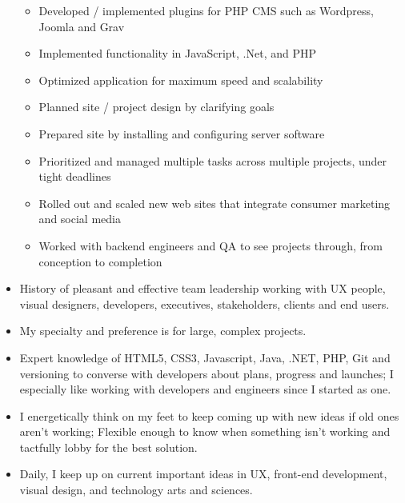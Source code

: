 \documentclass{resume}
\begin{document}
\begin{itemize}
\begin{itemize}
      \item Developed / implemented plugins for PHP CMS such as Wordpress, Joomla and Grav
      \item Implemented functionality in JavaScript, .Net, and PHP
      \item Optimized application for maximum speed and scalability
      \item Planned site / project design by clarifying goals
      \item Prepared site by installing and configuring server software
      \item Prioritized and managed multiple tasks across multiple projects, under tight deadlines
      \item Rolled out and scaled new web sites that integrate consumer marketing and social media
      \item Worked with backend engineers and QA to see projects through, from conception to completion
    \end{itemize}
    \item History of pleasant and effective team leadership working with UX people, visual designers, developers, executives, stakeholders, clients and end users.
    \item My specialty and preference is for large, complex projects.
    \item Expert knowledge of HTML5, CSS3, Javascript, Java, .NET, PHP, Git and versioning to converse with developers about plans, progress and launches; I especially like working with developers and engineers since I started as one.
    \item I energetically think on my feet to keep coming up with new ideas if old ones aren’t working; Flexible enough to know when something isn’t working and tactfully lobby for the best solution.
    \item Daily, I keep up on current important ideas in UX, front-end development, visual design, and technology arts and sciences.
  \end{itemize}
\end{document}
